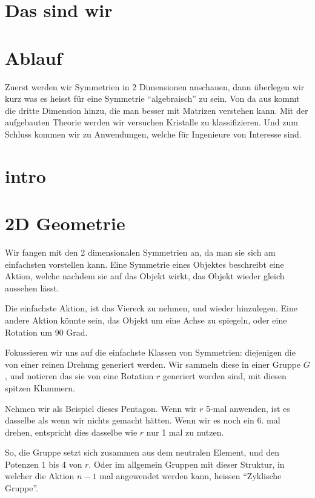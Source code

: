 \documentclass[a4paper]{article}
\newcommand{\scene}[1]{\par\noindent[ #1 ]\par}
\begin{document}
\section{Das sind wir}
\scene{Camera}

\section{Ablauf}
Zuerst werden wir Symmetrien in 2 Dimensionen anschauen, dann \"uberlegen wir
kurz was es heisst f\"ur eine Symmetrie ``algebraisch'' zu sein. Von da aus
kommt die dritte Dimension hinzu, die man besser mit Matrizen verstehen kann.
Mit der aufgebauten Theorie werden wir versuchen Kristalle zu klassifizieren.
Und zum Schluss kommen wir zu Anwendungen, welche f\"ur Ingenieure von
Interesse sind.

\section{intro}
\scene{Spontan}

\section{2D Geometrie}
\scene{Intro}
Wir fangen mit den 2 dimensionalen Symmetrien an, da man sie sich am
einfachsten vorstellen kann. Eine Symmetrie eines Objektes beschreibt eine
Aktion, welche nachdem sie auf das Objekt wirkt, das Objekt wieder gleich
aussehen l\"asst.

\scene{Viereck}
Die einfachste Aktion, ist das Viereck zu nehmen, und wieder hinzulegen.
Eine andere Aktion k\"onnte sein, das Objekt um eine Achse zu spiegeln,
oder eine Rotation um 90 Grad.

\scene{Zyklische Gruppe}
Fokussieren wir uns auf die einfachste Klassen von Symmetrien: diejenigen die
von einer reinen Drehung generiert werden. Wir sammeln diese in einer Gruppe
\(G\), und notieren das sie von eine Rotation \(r\) generiert worden sind, mit
diesen spitzen Klammern.

Nehmen wir als Beispiel dieses Pentagon. Wenn wir \(r\) 5-mal anwenden, ist es
dasselbe als wenn wir nichts gemacht h\"atten. Wenn wir es noch ein 6. mal
drehen, entspricht dies dasselbe wie \(r\) nur 1 mal zu nutzen.

\scene{Notation}
So, die Gruppe setzt sich zusammen aus dem neutralen Element, und den Potenzen
1 bis 4 von \(r\). Oder im allgemein Gruppen mit dieser Struktur, in welcher die
Aktion \(n-1\) mal angewendet werden kann, heissen ``Zyklische Gruppe''.
\end{document}

